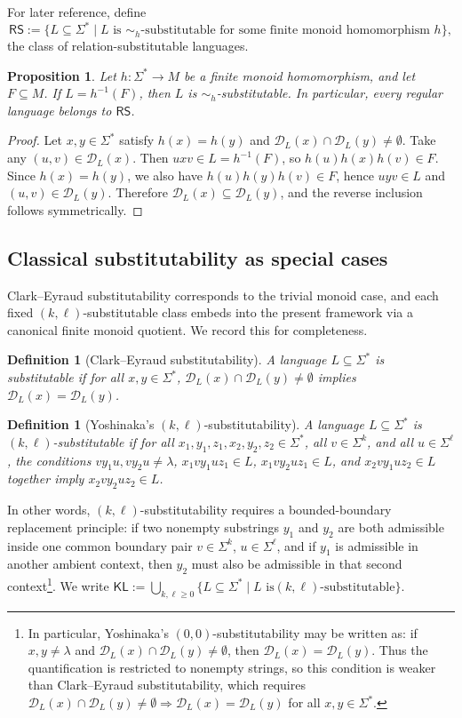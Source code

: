 \documentclass[11pt,a4paper]{article}
\newtheorem{proposition}[theorem]{Proposition}
\newtheorem{definition}[theorem]{Definition}
\newcommand{\D}{\mathcal{D}}
\begin{document}
For later reference, define
\[\mathsf{RS}:=\{L\subseteq\Sigma^*\mid\text{$L$ is $\sim_h$-substitutable
for some finite monoid homomorphism $h$}\},\]
the class of relation-substitutable languages.

\begin{proposition}\label{prop:regular-auto}
Let $h:\Sigma^*\to M$ be a finite monoid homomorphism, and let
$F\subseteq M$. If $L=h^{-1}(F)$, then $L$ is
$\sim_h$-substitutable. In particular, every regular language belongs to
$\mathsf{RS}$.
\end{proposition}

\begin{proof}
Let $x,y\in\Sigma^*$ satisfy $h(x)=h(y)$ and
$\D_L(x)\cap\D_L(y)\neq\emptyset$. Take any $(u,v)\in\D_L(x)$. Then
$uxv\in L=h^{-1}(F)$, so $h(u)h(x)h(v)\in F$. Since $h(x)=h(y)$, we
also have $h(u)h(y)h(v)\in F$, hence $uyv\in L$ and
$(u,v)\in\D_L(y)$. Therefore $\D_L(x)\subseteq\D_L(y)$, and the reverse
inclusion follows symmetrically.
\end{proof}

\subsection{Classical substitutability as special cases}
\label{subsec:classical-subst}

Clark--Eyraud substitutability corresponds to the trivial monoid case,
and each fixed $(k,\ell)$-substitutable class embeds into the present
framework via a canonical finite monoid quotient. We record this for
completeness.

\begin{definition}[Clark--Eyraud substitutability]
A language $L\subseteq\Sigma^*$ is \emph{substitutable} if for all
$x,y\in\Sigma^*$, $\D_L(x)\cap\D_L(y)\neq\emptyset$ implies
$\D_L(x)=\D_L(y)$.
\end{definition}

\begin{definition}[Yoshinaka's \texorpdfstring{$(k,\ell)$}{(k,l)}-substitutability]
A language $L\subseteq\Sigma^*$ is \emph{$(k,\ell)$-substitutable} if
for all $x_1,y_1,z_1,x_2,y_2,z_2\in\Sigma^*$, all $v\in\Sigma^k$, and
all $u\in\Sigma^\ell$, the conditions $vy_1u,vy_2u\neq\lambda$,
$x_1vy_1uz_1\in L$, $x_1vy_2uz_1\in L$, and $x_2vy_1uz_2\in L$ together
imply $x_2vy_2uz_2\in L$.
\end{definition}

In other words, $(k,\ell)$-substitutability requires a bounded-boundary
replacement principle: if two nonempty substrings $y_1$ and $y_2$ are both
admissible inside one common boundary pair $v\in\Sigma^k$, $u\in\Sigma^\ell$,
and if $y_1$ is admissible in another ambient context, then $y_2$ must also be
admissible in that second context\footnote{In particular, Yoshinaka's
$(0,0)$-substitutability may be written as: if $x,y\neq\lambda$ and
$\D_L(x)\cap\D_L(y)\neq\emptyset$, then $\D_L(x)=\D_L(y)$. Thus the
quantification is restricted to nonempty strings, so this condition is weaker
than Clark--Eyraud substitutability, which requires
$\D_L(x)\cap\D_L(y)\neq\emptyset \Rightarrow \D_L(x)=\D_L(y)$ for all
$x,y\in\Sigma^*$.}. We write
$\mathsf{KL}:=\bigcup_{k,\ell\ge0}\{L\subseteq\Sigma^*\mid\text{$L$ is
$(k,\ell)$-substitutable}\}$.
\end{document}
